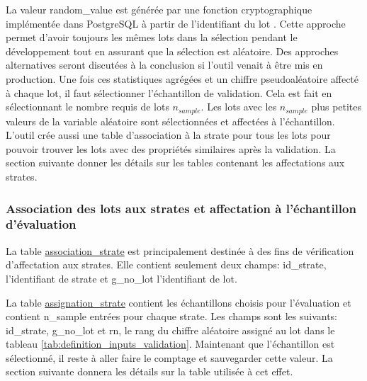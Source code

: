         La valeur random\_value est générée par une fonction cryptographique implémentée dans PostgreSQL à partir de l'identifiant du lot \parencite{postgresql_global_development_group_f26_2025}. Cette approche permet d'avoir toujours les mêmes lots dans la sélection pendant le développement tout en assurant que la sélection est aléatoire. Des approches alternatives seront discutées à la conclusion si l'outil venait à être mis en production. 
        Une fois ces statistiques agrégées et un chiffre pseudoaléatoire affecté à chaque lot, il faut sélectionner l'échantillon de validation. Cela est fait en sélectionnant le nombre requis de lots $n_{sample}$. Les lots avec les $n_{sample}$ plus petites valeurs de la variable aléatoire sont sélectionnées et affectées à l'échantillon. L'outil crée aussi une table d'association à la strate pour tous les lots pour pouvoir trouver les lots avec des propriétés similaires après la validation. La section suivante donner les détails sur les tables contenant les affectations aux strates.
        \subsubsection{Association des lots aux strates et affectation à l'échantillon d'évaluation}     
        La table \ul{association\_strate} est principalement destinée à des fins de vérification d'affectation aux strates. Elle contient seulement deux champs: id\_strate, l'identifiant de strate et g\_no\_lot l'identifiant de lot. \par
        La table \ul{assignation\_strate} contient les échantillons choisis pour l'évaluation et contient n\_sample entrées pour chaque strate. Les champs sont les suivants: id\_strate, g\_no\_lot et rn, le rang du chiffre aléatoire assigné au lot dans le tableau \ref{tab:definition_inputs_validation}. Maintenant que l'échantillon est sélectionné, il reste à aller faire le comptage et sauvegarder cette valeur. La section suivante donnera les détails sur la table utilisée à cet effet.

